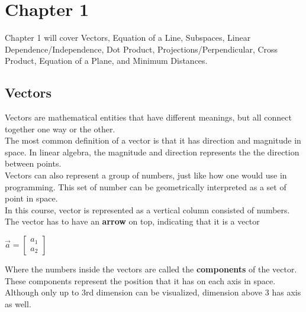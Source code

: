 \documentclass[12pt]{article}
\begin{document}
\section{Chapter 1}
Chapter 1 will cover Vectors, Equation of a Line, Subspaces, Linear Dependence/Independence, Dot Product, Projections/Perpendicular, Cross Product, Equation of a Plane, and Minimum Distances.
\subsection{Vectors}
Vectors are mathematical entities that have different meanings, but all connect together one way or the other.\\
The most common definition of a vector is that it has direction and magnitude in space. In linear algebra, the magnitude and direction represents the the direction between points.\\
Vectors can also represent a group of numbers, just like how one would use in programming. This set of number can be geometrically interpreted as a set of point in space.\\

In this course, vector is represented as a vertical column consisted of numbers. The vector has to have an \textbf{arrow} on top, indicating that it is a vector\\
\begin{center}
$\vec{a} = \begin{bmatrix}a_1\\a_2\end{bmatrix}$
\end{center}
Where the numbers inside the vectors are called the \textbf{components} of the vector. These components represent the position that it has on each axis in space. Although only up to 3rd dimension can be visualized, dimension above 3 has axis as well.
\end{document}
